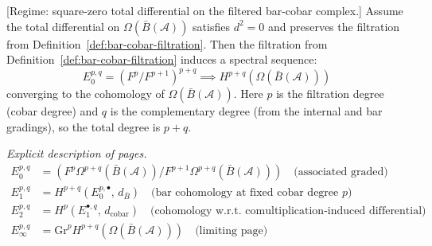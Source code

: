 \begin{theorem}\label{thm:bar-cobar-spectral-sequence}
\label{thm:koszul-spectral-sequence}
\textup{[Regime: square-zero total differential on the filtered
bar-cobar complex.]}
Assume the total differential on $\Omega(\bar{B}(\mathcal{A}))$
satisfies $d^2 = 0$ and preserves the filtration from
Definition~\ref{def:bar-cobar-filtration}. Then the filtration from
Definition~\ref{def:bar-cobar-filtration} induces a spectral
sequence:
\[E_0^{p,q} = \left(F^p / F^{p+1}\right)^{p+q} \implies H^{p+q}(\Omega(\bar{B}(\mathcal{A})))\]
converging to the cohomology of $\Omega(\bar{B}(\mathcal{A}))$. Here $p$ is the filtration degree (cobar degree) and $q$ is the complementary degree (from the internal and bar gradings), so the total degree is $p + q$.

\emph{Explicit description of pages.}
\begin{align*}
E_0^{p,q} &= \left(F^p\Omega^{p+q}(\bar{B}(\mathcal{A})) \big/ F^{p+1}\Omega^{p+q}(\bar{B}(\mathcal{A}))\right) \quad \text{(associated graded)} \\
E_1^{p,q} &= H^{p+q}\!\left(E_0^{p,\bullet},\, d_{\bar{B}}\right)
 \quad \text{(bar cohomology at fixed cobar degree $p$)} \\
E_2^{p,q} &= H^p\!\left(E_1^{\bullet,q},\, d_{\text{cobar}}\right)
 \quad \text{(cohomology w.r.t.\ comultiplication-induced differential)} \\
E_\infty^{p,q} &= \mathrm{Gr}^p H^{p+q}(\Omega(\bar{B}(\mathcal{A}))) \quad \text{(limiting page)}
\end{align*}
\end{theorem}

